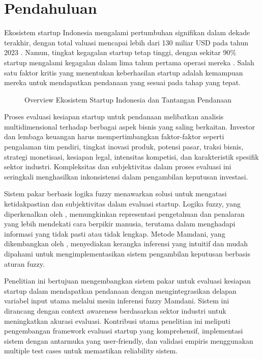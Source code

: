 \documentclass[12pt,a4paper]{article}
\begin{document}
\newpage

\section{Pendahuluan}

Ekosistem startup Indonesia mengalami pertumbuhan signifikan dalam dekade terakhir, dengan total valuasi mencapai lebih dari 130 miliar USD pada tahun 2023 \citep{Sartika2023}. Namun, tingkat kegagalan startup tetap tinggi, dengan sekitar 90\% startup mengalami kegagalan dalam lima tahun pertama operasi mereka \citep{Rahman2022}. Salah satu faktor kritis yang menentukan keberhasilan startup adalah kemampuan mereka untuk mendapatkan pendanaan yang sesuai pada tahap yang tepat.

\begin{figure}[htbp] %
    \centering
    \caption{Overview Ekosistem Startup Indonesia dan Tantangan Pendanaan}
    \label{fig:ecosystem}
\end{figure}

Proses evaluasi kesiapan startup untuk pendanaan melibatkan analisis multidimensional terhadap berbagai aspek bisnis yang saling berkaitan. Investor dan lembaga keuangan harus mempertimbangkan faktor-faktor seperti pengalaman tim pendiri, tingkat inovasi produk, potensi pasar, traksi bisnis, strategi monetisasi, kesiapan legal, intensitas kompetisi, dan karakteristik spesifik sektor industri. Kompleksitas dan subjektivitas dalam proses evaluasi ini seringkali menghasilkan inkonsistensi dalam pengambilan keputusan investasi.

Sistem pakar berbasis logika fuzzy menawarkan solusi untuk mengatasi ketidakpastian dan subjektivitas dalam evaluasi startup. Logika fuzzy, yang diperkenalkan oleh \citet{Zadeh1965}, memungkinkan representasi pengetahuan dan penalaran yang lebih mendekati cara berpikir manusia, terutama dalam menghadapi informasi yang tidak pasti atau tidak lengkap. Metode Mamdani, yang dikembangkan oleh \citet{Mamdani1975}, menyediakan kerangka inferensi yang intuitif dan mudah dipahami untuk mengimplementasikan sistem pengambilan keputusan berbasis aturan fuzzy.

Penelitian ini bertujuan mengembangkan sistem pakar untuk evaluasi kesiapan startup dalam mendapatkan pendanaan dengan mengintegrasikan delapan variabel input utama melalui mesin inferensi fuzzy Mamdani. Sistem ini dirancang dengan context awareness berdasarkan sektor industri untuk meningkatkan akurasi evaluasi. Kontribusi utama penelitian ini meliputi pengembangan framework evaluasi startup yang komprehensif, implementasi sistem dengan antarmuka yang user-friendly, dan validasi empiris menggunakan multiple test cases untuk memastikan reliability sistem.
\end{document}
